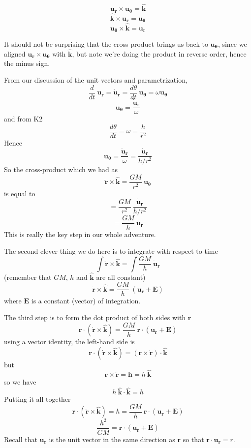 \documentclass[11pt, oneside]{article}   	%
\begin{document}
\[ \mathbf{u_r} \times \mathbf{u_{\theta}} = \hat{\mathbf{k}} \]
\[ \hat{\mathbf{k}} \times \mathbf{u_r} = \mathbf{u_{\theta}} \]
\[ \mathbf{u_{\theta}} \times \hat{\mathbf{k}} = \mathbf{u_r} \]

It should not be surprising that the cross-product brings us back to $\mathbf{u_\theta}$, since we aligned $\mathbf{u_r} \times \mathbf{u_{\theta}}$ with $\hat{\mathbf{k}}$, but note we're doing the product in reverse order, hence the minus sign.

From our discussion of the unit vectors and parametrization,
\[ \frac{d}{dt} \ \mathbf{u_r} = \dot{\mathbf{u}}_\mathbf{r} = \frac{d\theta}{dt} \ \mathbf{u_\theta} = \omega \mathbf{u_\theta} \]
\[ \mathbf{u_\theta} = \frac{\dot{\mathbf{u}}_{\mathbf{r}}}{\omega} \]
and from K2
\[ \frac{d \theta}{dt} = \omega = \frac{h}{r^2} \]
Hence
\[  \mathbf{u_\theta} =  \frac{\dot{\mathbf{u}}_{\mathbf{r}}}{\omega} = \frac{\dot{\mathbf{u}}_{\mathbf{r}}}{h/r^2} \]
So the cross-product which we had as
\[ \ddot{\mathbf{r}} \times \hat{\mathbf{k}} = \frac{GM}{r^2} \  \mathbf{u_\theta} \]
is equal to
\[ = \frac{GM}{r^2} \  \frac{\dot{\mathbf{u}}_{\mathbf{r}}}{h/r^2} \]
\[ = \frac{GM}{h} \ \dot{\mathbf{u}}_{\mathbf{r}}  \]
This is really the key step in our whole adventure. 

The second clever thing we do here is to integrate with respect to time
\[ \int \ddot{\mathbf{r}} \times \hat{\mathbf{k}} = \int \frac{GM}{h} \ \dot{\mathbf{u}}_{\mathbf{r}}  \]
(remember that $GM$, $h$ and $\hat{\mathbf{k}}$ are all constant)
\[ \dot{\mathbf{r}} \times \hat{\mathbf{k}} = \frac{GM}{h} \ ( \mathbf{u_r} + \mathbf{E}) \]
where $ \mathbf{E}$ is a constant (vector) of integration.

The third step is to form the dot product of both sides with $\mathbf{r}$
\[ \mathbf{r} \cdot ( \dot{\mathbf{r}} \times \hat{\mathbf{k}}) = \frac{GM}{h} \ \mathbf{r} \cdot ( \mathbf{u_r} + \mathbf{E}) \]
using a vector identity, the left-hand side is
\[ \mathbf{r} \cdot ( \dot{\mathbf{r}} \times \hat{\mathbf{k}}) = (\mathbf{r} \times \dot{\mathbf{r}}) \cdot \hat{\mathbf{k}} \]
but 
\[ \mathbf{r} \times \dot{\mathbf{r}} = \mathbf{h} =  h \ \hat{\mathbf{k}} \]
so we have
\[ h \ \hat{\mathbf{k}} \cdot \hat{\mathbf{k}} = h \]
Putting it all together
\[ \mathbf{r} \cdot (\ddot{\mathbf{r}} \times \hat{\mathbf{k}}) = h = \frac{GM}{h} \ \mathbf{r} \cdot ( \mathbf{u_r} + \mathbf{E}) \]
\[ \frac{h^2}{GM} =  \mathbf{r} \cdot ( \mathbf{u_r}+ \mathbf{E}) \]
Recall that $ \mathbf{u_r}$ is the unit vector in the same direction as $\mathbf{r}$ so that $\mathbf{r} \cdot  \mathbf{u_r} = r$.
\end{document}
